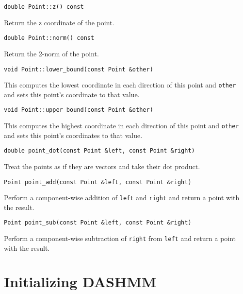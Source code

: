 \begin{lstlisting}
double Point::z() const
\end{lstlisting}

\noindent Return the z coordinate of the point.

\begin{lstlisting}
double Point::norm() const
\end{lstlisting}

\noindent Return the 2-norm of the point.

\begin{lstlisting}
void Point::lower_bound(const Point &other)
\end{lstlisting}

\noindent This computes the lowest coordinate in each direction of this point
and \texttt{other} and sets this point's coordinate to that value.

\begin{lstlisting}
void Point::upper_bound(const Point &other)
\end{lstlisting}

\noindent This computes the highest coordinate in each direction of this point
and \texttt{other} and sets this point's coordinates to that value.

\begin{lstlisting}
double point_dot(const Point &left, const Point &right)
\end{lstlisting}

\noindent Treat the points as if they are vectors and take their dot product.

\begin{lstlisting}
Point point_add(const Point &left, const Point &right)
\end{lstlisting}

\noindent Perform a  component-wise addition of \texttt{left} and \texttt{right}
and return a point with the result.

\begin{lstlisting}
Point point_sub(const Point &left, const Point &right)
\end{lstlisting}

\noindent Perform a component-wise subtraction of \texttt{right} from
\texttt{left} and return a point with the result.


\section{Initializing DASHMM}

